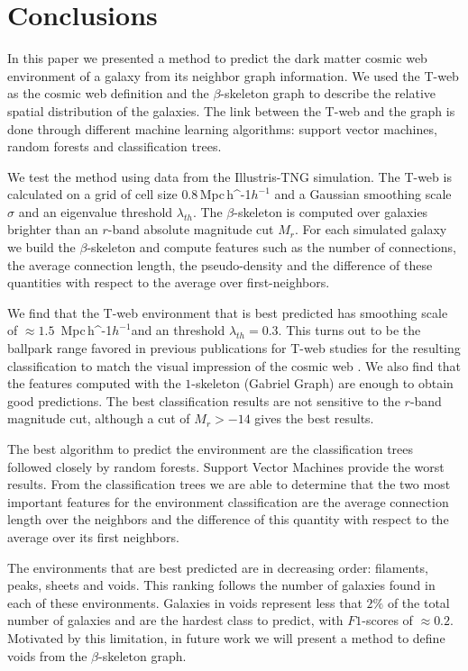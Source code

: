 \documentclass[usenatbib]{mnras}
\newcommand{\Mpch}{\,{\rm Mpc}\,\ifmmode h^{-1}\else $h^{-1}$\fi}
\begin{document}
\section{Conclusions}\label{sec:conclusions}

In this paper we presented a method to predict the dark matter cosmic web
environment of a galaxy from its neighbor graph information.
We used the T-web as the cosmic web definition \citep{Forero-Romero2009}
and the $\beta$-skeleton graph \citep{Fang2019} 
to describe the relative spatial distribution of the galaxies. 
The link between the T-web and the graph is done through different
machine learning algorithms: support vector machines, random forests and
classification trees.

We test the method using data from the Illustris-TNG simulation.
The T-web is calculated on a grid of cell size $0.8$\Mpch 
and a Gaussian smoothing scale $\sigma$ and an eigenvalue threshold $\lambda_{th}$.
The $\beta$-skeleton is computed over galaxies brighter than 
an $r$-band absolute magnitude cut $M_{r}$.
For each simulated galaxy we build the $\beta$-skeleton and
compute features such as the number of connections, the average connection
length, the pseudo-density and the difference of these quantities with
respect to the average over first-neighbors.

We find that the T-web environment that is best predicted has smoothing
scale of $\approx1.5$ \Mpch and an threshold $\lambda_{th}=0.3$. 
This turns out to be the ballpark range  favored in previous publications
for T-web  studies for the resulting classification to match the visual impression of the cosmic web \citep{Forero-Romero2009}.
We also find that the features computed with the $1$-skeleton 
(Gabriel Graph) are enough to obtain good predictions. 
The best classification results are not sensitive to the $r$-band
magnitude cut, although a cut of $M_r>-14$ gives the best results.

The best algorithm to predict the environment are the classification
trees followed closely by random forests. 
Support Vector Machines provide the worst results.
From the classification trees we are able to determine that the two most
important features for the environment classification are the average
connection length over the neighbors and the difference of this quantity
with respect to the average over its first neighbors.

The environments that are best predicted are in decreasing order: 
filaments, peaks, sheets and voids. 
This ranking follows the number of galaxies found in each of these environments.
Galaxies in voids represent less that $2\%$ of the total number of galaxies and 
are the hardest class to predict, with $F1$-scores of $\approx0.2$.
Motivated by this limitation, in future work we will present a method to define
voids from the $\beta$-skeleton graph.
\end{document}
